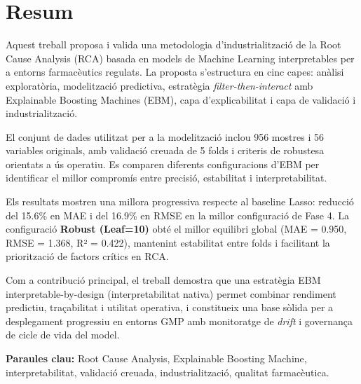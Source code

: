 \section{Resum}

Aquest treball proposa i valida una metodologia d'industrialització de la Root Cause Analysis (RCA) basada en models de Machine Learning interpretables per a entorns farmacèutics regulats. La proposta s'estructura en cinc capes: anàlisi exploratòria, modelització predictiva, estratègia \emph{filter-then-interact} amb Explainable Boosting Machines (EBM), capa d'explicabilitat i capa de validació i industrialització.

El conjunt de dades utilitzat per a la modelització inclou 956 mostres i 56 variables originals, amb validació creuada de 5 folds i criteris de robustesa orientats a ús operatiu. Es comparen diferents configuracions d'EBM per identificar el millor compromís entre precisió, estabilitat i interpretabilitat.

Els resultats mostren una millora progressiva respecte al baseline Lasso: reducció del 15.6\% en MAE i del 16.9\% en RMSE en la millor configuració de Fase 4. La configuració \textbf{Robust (Leaf=10)} obté el millor equilibri global (MAE = 0.950, RMSE = 1.368, R² = 0.422), mantenint estabilitat entre folds i facilitant la priorització de factors crítics en RCA.

Com a contribució principal, el treball demostra que una estratègia EBM interpretable-by-design (interpretabilitat nativa) permet combinar rendiment predictiu, traçabilitat i utilitat operativa, i constitueix una base sòlida per a desplegament progressiu en entorns GMP amb monitoratge de \emph{drift} i governança de cicle de vida del model.

\textbf{Paraules clau:} Root Cause Analysis, Explainable Boosting Machine, interpretabilitat, validació creuada, industrialització, qualitat farmacèutica.
